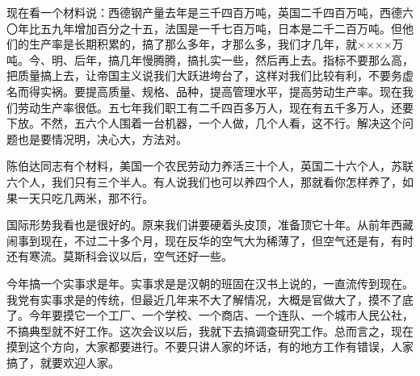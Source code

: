 现在看一个材料说：西德钢产量去年是三千四百万吨，英国二千四百万吨，西德六〇年比五九年增加百分之十五，法国是一千七百万吨，日本是二千二百万吨。但他们的生产率是长期积累的，搞了那么多年，才那么多，我们才几年，就××××万吨。今、明、后年，搞几年慢腾腾，搞扎实一些，然后再上去。指标不要那么高，把质量搞上去，让帝国主义说我们大跃进垮台了，这样对我们比较有利，不要务虚名而得实祸。要提高质量、规格、品种，提高管理水平，提高劳动生产率。现在我们劳动生产率很低。五七年我们职工有二千四百多万人，现在有五千多万人，还要下放。不然，五六个人围着一台机器，一个人做，几个人看，这不行。解决这个问题也是要情况明，决心大，方法对。

陈伯达同志有个材料，美国一个农民劳动力养活三十个人，英国二十六个人，苏联六个人，我们只有三个半人。有人说我们也可以养四个人，那就看你怎样养了，如果一天只吃几两米，那不行。

国际形势我看也是很好的。原来我们讲要硬着头皮顶，准备顶它十年。从前年西藏闹事到现在，不过二十多个月，现在反华的空气大为稀薄了，但空气还是有，有时还有寒流。莫斯科会议以后，空气还好一些。

今年搞一个实事求是年。实事求是是汉朝的班固在汉书上说的，一直流传到现在。我党有实事求是的传统，但最近几年来不大了解情况，大概是官做大了，摸不了底了。今年要摸它一个工厂、一个学校、一个商店、一个连队、一个城市人民公社，不搞典型就不好工作。这次会议以后，我就下去搞调查研究工作。总而言之，现在摸到这个方向，大家都要进行。不要只讲人家的坏话，有的地方工作有错误，人家搞了，就要欢迎人家。

